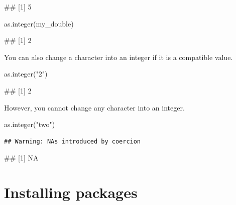 \documentclass[
]{book}
\newenvironment{Shaded}{\begin{snugshade}}{\end{snugshade}}
\newcommand{\FunctionTok}[1]{\textcolor[rgb]{0.00,0.00,0.00}{#1}}
\newcommand{\NormalTok}[1]{#1}
\newcommand{\StringTok}[1]{\textcolor[rgb]{0.31,0.60,0.02}{#1}}
\begin{document}
\begin{Shaded}
\begin{Highlighting}[]
\NormalTok{\#\# [1] 5}
\end{Highlighting}
\end{Shaded}

\begin{Shaded}
\begin{Highlighting}[]
\FunctionTok{as.integer}\NormalTok{(my\_double)}
\end{Highlighting}
\end{Shaded}

\begin{Shaded}
\begin{Highlighting}[]
\NormalTok{\#\# [1] 2}
\end{Highlighting}
\end{Shaded}

You can also change a character into an integer if it is a compatible value.

\begin{Shaded}
\begin{Highlighting}[]
\FunctionTok{as.integer}\NormalTok{(}\StringTok{"2"}\NormalTok{)}
\end{Highlighting}
\end{Shaded}

\begin{Shaded}
\begin{Highlighting}[]
\NormalTok{\#\# [1] 2}
\end{Highlighting}
\end{Shaded}

However, you cannot change any character into an integer.

\begin{Shaded}
\begin{Highlighting}[]
\FunctionTok{as.integer}\NormalTok{(}\StringTok{"two"}\NormalTok{)}
\end{Highlighting}
\end{Shaded}

\begin{verbatim}
## Warning: NAs introduced by coercion
\end{verbatim}

\begin{Shaded}
\begin{Highlighting}[]
\NormalTok{\#\# [1] NA}
\end{Highlighting}
\end{Shaded}

\hypertarget{installing-packages}{%
\section{Installing packages}\label{installing-packages}}
\end{document}
